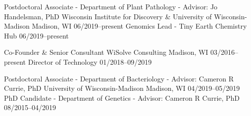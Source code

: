 

\begin{cventries}

\cventry
{Postdoctoral Associate - Department of Plant Pathology - Advisor: Jo Handelsman, PhD}
{Wisconsin Institute for Discovery \& University of Wisconsin-Madison}
{Madison, WI}
{06/2019--present}
{
}
\vspace{-0.4cm}
\cventry
{Genomics Lead - Tiny Earth Chemistry Hub}
{}
{}
{06/2019--present}
{}

\vspace{-0.4cm}

\cventry
{Co-Founder \& Senior Consultant}
{WiSolve Consulting}
{Madison, WI}
{03/2016--present}
{}
\vspace{-0.4cm}
\cventry
{Director of Technology}
{}
{}
{01/2018--09/2019}
{
}

\vspace{-0.4cm}
  
\cventry
{Postdoctoral Associate - Department of Bacteriology - Advisor: Cameron R Currie, PhD}
{University of Wisconsin-Madison}
{Madison, WI}
{04/2019--05/2019}
{}
\vspace{-0.4cm}
\cventry
{PhD Candidate - Department of Genetics - Advisor: Cameron R Currie, PhD}
{}
{}
{08/2015--04/2019}
{
}


\end{cventries}
